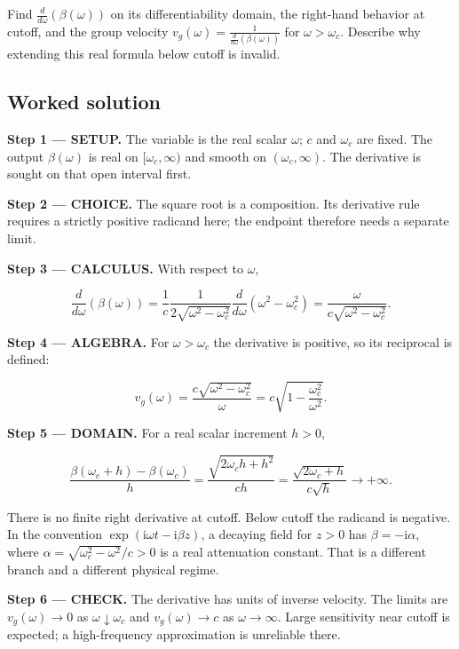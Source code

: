 \documentclass[11pt,oneside,openany]{book}
\begin{document}
Find \(\frac{d}{d\omega}(\beta(\omega))\) on its differentiability domain, the right-hand behavior at cutoff, and the group velocity \(v_g(\omega)=\frac{1}{\frac{d}{d\omega}\left(\beta(\omega)\right)}\) for \(\omega>\omega_c\). Describe why extending this real formula below cutoff is invalid.
\subsection*{Worked solution}

\textbf{Step 1 --- SETUP.} The variable is the real scalar \(\omega\); \(c\) and \(\omega_c\) are fixed. The output \(\beta(\omega)\) is real on \([\omega_c,\infty)\) and smooth on \((\omega_c,\infty)\). The derivative is sought on that open interval first.

\begin{ChoiceStep}
\textbf{Step 2 --- CHOICE.} The square root is a composition. Its derivative rule requires a strictly positive radicand here; the endpoint therefore needs a separate limit.

\end{ChoiceStep}
\textbf{Step 3 --- CALCULUS.} With respect to \(\omega\),

\[
\frac{d}{d\omega}\left(\beta(\omega)\right)
=\frac{1}{c}\frac{1}{2\sqrt{\omega^2-\omega_c^2}}\frac{d}{d\omega}\left(\omega^2-\omega_c^2\right)
=\frac{\omega}{c\sqrt{\omega^2-\omega_c^2}}.
\]

\begingroup\color{AlgebraBlue}
\textbf{Step 4 --- ALGEBRA.} For \(\omega>\omega_c\) the derivative is positive, so its reciprocal is defined:

\[
v_g(\omega)=\frac{c\sqrt{\omega^2-\omega_c^2}}{\omega}
=c\sqrt{1-\frac{\omega_c^2}{\omega^2}}.
\]

\endgroup
\begin{DomainStep}
\textbf{Step 5 --- DOMAIN.} For a real scalar increment \(h>0\),

\[
\frac{\beta(\omega_c+h)-\beta(\omega_c)}{h}
=\frac{\sqrt{2\omega_c h+h^2}}{ch}
=\frac{\sqrt{2\omega_c+h}}{c\sqrt h}\longrightarrow+\infty.
\]

There is no finite right derivative at cutoff. Below cutoff the radicand is negative. In the convention \(\exp(\mathrm{i}\omega t-\mathrm{i}\beta z)\), a decaying field for \(z>0\) has \(\beta=-\mathrm{i}\alpha\), where \(\alpha=\sqrt{\omega_c^2-\omega^2}/c>0\) is a real attenuation constant. That is a different branch and a different physical regime.

\end{DomainStep}
\textbf{Step 6 --- CHECK.} The derivative has units of inverse velocity. The limits are \(v_g(\omega)\to0\) as \(\omega\downarrow\omega_c\) and \(v_g(\omega)\to c\) as \(\omega\to\infty\). Large sensitivity near cutoff is expected; a high-frequency approximation is unreliable there.
\end{document}
